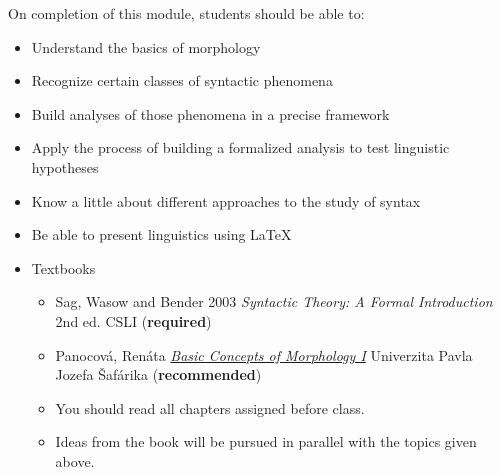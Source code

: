 \documentclass[a4paper,landscape,headrule,footrule]{foils}
\begin{document}



On completion of this module, students should be able to:
\begin{itemize}
\item Understand the basics of morphology
\item Recognize certain classes of syntactic phenomena
\item Build analyses of those phenomena in a precise framework
\item Apply the process of building a formalized analysis to test
  linguistic hypotheses
\item Know a little about different approaches to the study of syntax
\item Be able to present linguistics using LaTeX
\end{itemize}
    
%



\begin{itemize}
\item Textbooks
  \begin{itemize}
  \item Sag, Wasow and Bender 2003 \textit{Syntactic Theory: A Formal Introduction} 2nd ed. CSLI (\textbf{required})
 \item Panocová, Renáta \href{https://unibook.upjs.sk/img/cms/2021/FF/basic-concepts-of-morphology-1.pdf}{\textit{Basic Concepts of Morphology I}} Univerzita Pavla Jozefa Šafárika  (\textbf{recommended})
  \end{itemize}

  
  \begin{itemize}
  \item You should read all chapters assigned before class.
  \item Ideas from the book will be pursued in parallel with the
    topics given above.
  \end{itemize}
\end{itemize}
\end{document}

